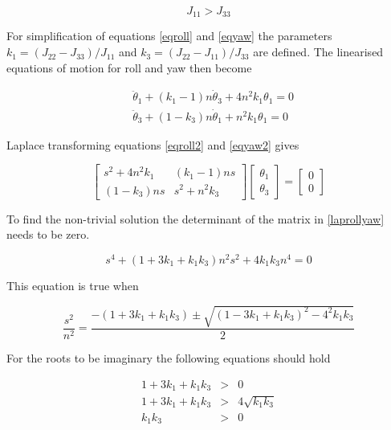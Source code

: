 \begin{equation}
J_{11}>J_{33}
\label{Js1}
\end{equation}

For simplification of equations \ref{eqroll} and \ref{eqyaw} the parameters $k_1 = (J_{22}-J_{33})/J_{11}$ and $k_3 = (J_{22}-J_{11})/J_{33}$ are defined. The linearised equations of motion for roll and yaw then become

\begin{eqnarray}
&\ddot{\theta}_1 + \left(k_1-1\right)n\dot{\theta}_3 + 4n^2k_1\theta_1 = 0 \label{eqroll2}\\
&\ddot{\theta}_3 + \left(1 - k_3\right)n\dot{\theta}_1 + n^2k_1\theta_1 = 0 \label{eqyaw2}
\end{eqnarray}

Laplace transforming equations \ref{eqroll2} and \ref{eqyaw2} gives

\begin{equation}
\begin{bmatrix}
s^2+4n^2k_1 & (k_1-1)ns \\ 
(1-k_3)ns & s^2+n^2k_3
\end{bmatrix} \begin{bmatrix}\theta_1 \\ \theta_3 \end{bmatrix} = \begin{bmatrix}0 \\ 0 \end{bmatrix}
\label{laprollyaw}
\end{equation}

To find the non-trivial solution the determinant of the matrix in \ref{laprollyaw} needs to be zero.

\begin{equation}
s^4 +(1+3k_1 + k_1k_3)n^2s^2 + 4k_1k_3n^4 = 0
\label{detmatr}
\end{equation}

This equation is true when

\begin{equation}
\frac{s^2}{n^2} = \frac{-(1+3k_1 + k_1k_3) \pm \sqrt{(1-3k_1+k_1k_3)^2 - 4^2k_1k_3}}{2}
\label{detmatrsol}
\end{equation}

For the roots to be imaginary the following equations should hold

\begin{eqnarray}
1+3k_1+k_1k_3 &>& 0 \label{ks1} \\
1+3k_1+k_1k_3 &>& 4\sqrt{k_1k_3} \label{ks2} \\
k_1k_3 &>& 0 \label{ks3}
\end{eqnarray}

